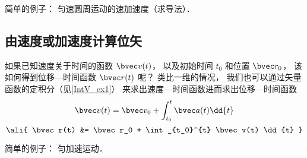 简单的例子： 匀速圆周运动的速加速度（求导法）．

\subsection{由速度或加速度计算位矢}

如果已知速度关于时间的函数 $\bvec v(t)$， 以及初始时间 $t_0$ 和位置 $\bvec r_0$， 该如何得到位移—时间函数 $\bvec r(t)$ 呢？ 类比一维的情况， 我们也可以通过矢量函数的定积分（见\autoref{IntV_ex1}） 来求出速度—时间函数进而求出位移—时间函数
\begin{equation}\label{VnA_eq7}
\bvec v(t) = \bvec v_0 + \int_{t_0}^{t} \bvec a(t) \dd{t}
\end{equation}
\begin{equation}\label{VnA_eq8}\ali{
\bvec r(t) &= \bvec r_0 + \int_{t_0}^{t} \bvec v(t) \dd{t}
}\end{equation}

简单的例子： 匀加速运动．
